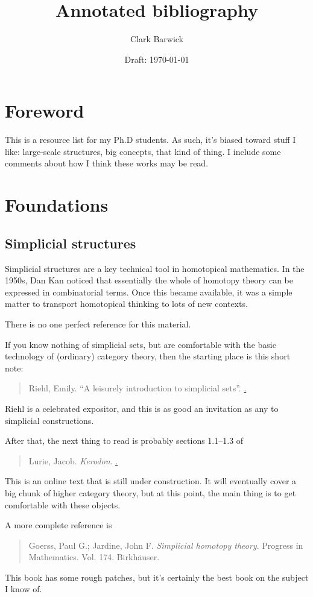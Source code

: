 \documentclass[draft=false, leqno]{article}
\title{Annotated bibliography}
\author{Clark Barwick}
\date{Draft: \today}
\begin{document}
\maketitle

\section{Foreword}%
\label{sec:Foreword}
This is a resource list for my Ph.D students.
As such, it's biased toward stuff I like:
large-scale structures, big concepts, that kind of thing.
I include some comments about how I think these works may be read.

\section{Foundations}%
\label{sec:Foundations}

\subsection{Simplicial structures}%
\label{sub:Simplicial structures}
Simplicial structures are a key technical tool in homotopical mathematics.
In the 1950s, Dan Kan noticed that essentially the whole of homotopy theory can be expressed in combinatorial terms.
Once this became available, it was a simple matter to transport homotopical thinking to lots of new contexts.

There is no one perfect reference for this material.

If you know nothing of simplicial sets, but are comfortable with the basic technology of (ordinary) category theory, then the starting place is this short note:
\begin{quotation}
  Riehl, Emily. \enquote{A leisurely introduction to simplicial sets}. \href{https://math.jhu.edu/~eriehl/ssets.pdf}.
\end{quotation}
Riehl is a celebrated expositor, and this is as good an invitation as any to simplicial constructions.

After that, the next thing to read is probably sections 1.1--1.3 of
\begin{quotation}
  Lurie, Jacob. \emph{Kerodon}. \href{https://kerodon.net}.
\end{quotation}
This is an online text that is still under construction.
It will eventually cover a big chunk of higher category theory, but
at this point, the main thing is to get comfortable with these objects.

A more complete reference is
\begin{quotation}
  Goerss, Paul G.; Jardine, John F. \emph{Simplicial homotopy theory}. Progress in Mathematics. Vol. 174. Birkhäuser.
\end{quotation}
This book has some rough patches, but it's certainly the best book on the subject I know of.
\end{document}
